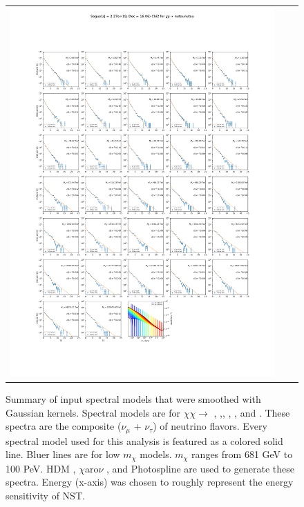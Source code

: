 \begin{figure}[!hb]
{\begin{tabular}{ccc}
            \includegraphics[clip, trim=22.1cm 6.5cm 19.5cm 56.5cm, scale=0.55]{figures/ic_DM/dm_plots/Segue1_nutaunutau_chi2_Masspanel_2024-04-28.pdf} \\
        \end{tabular}
    }\caption{Summary of input spectral models that were smoothed with Gaussian kernels. Spectral models are for $\chi\chi \rightarrow$ , \parpar{\mu},\parpar{\tau}, , \parpar{\nu_\mu}, and \parpar{\nu_\tau}. These spectra are the composite ($\nu_\mu$ + $\nu_\tau$) of neutrino flavors. Every spectral model used for this analysis is featured as a colored solid line. Bluer lines are for low $m_\chi$ models. $m_\chi$ ranges from 681 GeV to 100 PeV. HDM \cite{Rodd:HDM_spec}, $\chi$aro$\nu$ \cite{Charon}, and Photospline \cite{photospline} are used to generate these spectra. Energy (x-axis) was chosen to roughly represent the energy sensitivity of NST.}
    \label{fig:line_spectra_smooth}
\end{figure}

